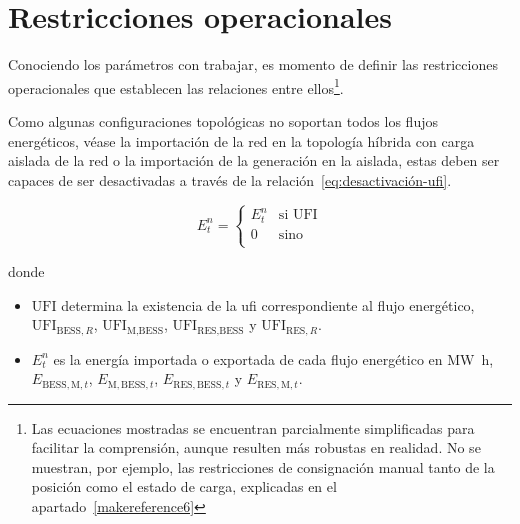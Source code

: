 \section{Restricciones operacionales}%
\label{makereference5.2}

Conociendo los parámetros con trabajar, es momento de definir las restricciones operacionales que establecen las relaciones entre ellos\footnote{Las ecuaciones mostradas se encuentran parcialmente simplificadas para facilitar la comprensión, aunque resulten más robustas en realidad. No se muestran, por ejemplo, las restricciones de consignación manual tanto de la posición como el estado de carga, explicadas en el apartado~\ref{makereference6}}.

Como algunas configuraciones topológicas no soportan todos los flujos energéticos, véase la importación de la red en la topología híbrida con carga aislada de la red o la importación de la generación en la aislada, estas deben ser capaces de ser desactivadas a través de la relación~\ref{eq:desactivación-ufi}.

\begin{samepage}

  \begin{equation}%
    \label{eq:desactivación-ufi}
    E^{n}_{t} =
    \begin{cases}
      E^{n}_{t} & \text{si } \text{UFI} \\
      0         & \text{sino}           \\
    \end{cases}
  \end{equation}

  donde

  \begin{itemize}

    \item \( \text{UFI} \) determina la existencia de la \gls{ufi} correspondiente al flujo energético,  \( \text{UFI}_{\text{BESS}, R} \), \( \text{UFI}_{\text{M}, \text{BESS}} \), \( \text{UFI}_{\text{RES}, \text{BESS}} \) y \( \text{UFI}_{\text{RES}, R} \).

    \item \( E^{n}_{t} \) es la energía importada o exportada de cada flujo energético en \si{{\mega\watt\hour}}, \( E_{\text{BESS}, \text{M}, t} \), \( E_{\text{M}, \text{BESS}, t} \), \( E_{\text{RES}, \text{BESS}, t} \) y \( E_{\text{RES}, \text{M}, t} \).

  \end{itemize}

\end{samepage}

